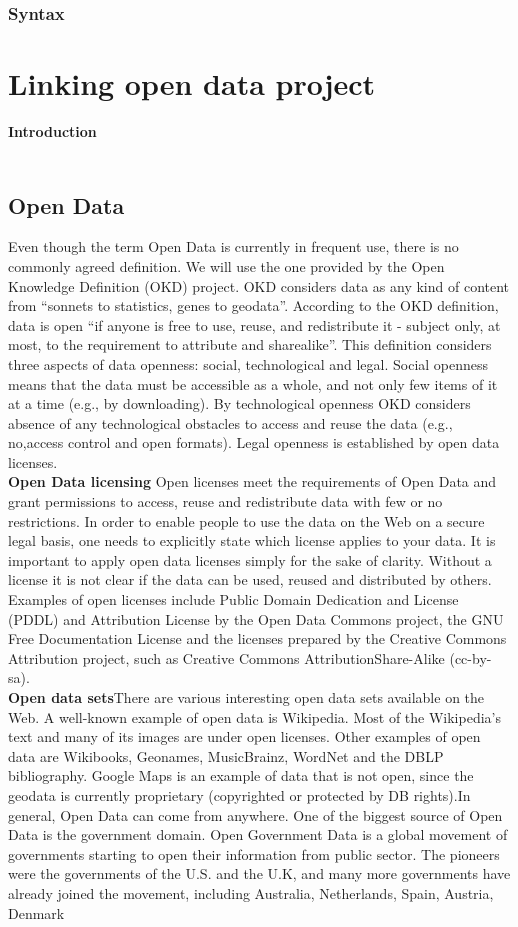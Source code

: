 \documentclass[a4paper,12pt,oneside]{report}
\begin{document}
{{{\subsection{Syntax}
\chapter{Linking open data project}
\textbf{\large Introduction}\\ \\
\section{Open Data}
{Even though the term Open Data is currently in frequent use, there is no commonly agreed definition. We will use the one provided by the Open Knowledge Definition (OKD) project. OKD considers data as any kind of content from “sonnets to statistics, genes to geodata”. According to the OKD definition, data is open “if anyone is free to use, reuse, and redistribute it - subject only, at most, to the requirement to attribute and sharealike”. This definition considers three aspects of data openness: social, technological and legal. Social openness means that the data must be accessible as a whole, and not only few items of it at a time (e.g., by downloading). By technological openness OKD considers absence of any technological obstacles to access and reuse the data (e.g., no,access control and open formats). Legal openness is established by open data licenses.\\
\textbf{Open Data licensing} Open licenses meet the requirements of Open Data and grant permissions to access, reuse and redistribute data with few or no restrictions. In order to enable people to use the data on the Web on a secure legal basis, one needs to
explicitly state which license applies to your data. It is important to apply open data licenses simply for the sake of clarity. Without a license it is not clear if the data can be used, reused and distributed by others. Examples of open licenses include Public
Domain Dedication and License (PDDL) and Attribution License by the Open Data Commons project, the GNU Free Documentation License and the licenses prepared by the Creative Commons Attribution project, such as Creative Commons AttributionShare-Alike (cc-by-sa).\\
\textbf{Open data sets}There are various interesting open data sets available on the Web. A well-known example of open data is Wikipedia. Most of the Wikipedia’s text and many of its images are under open licenses. Other examples of open data are Wikibooks, Geonames, MusicBrainz, WordNet and the DBLP bibliography. Google Maps is an example of data that is not open, since the geodata is currently proprietary (copyrighted or protected by DB rights).In general, Open Data can come from anywhere. One of the biggest source of Open Data is the government domain. Open Government Data is a global movement of governments starting to open their information from public sector. 
The pioneers were the governments of the U.S.  and the U.K, and many more governments have already joined the movement, including Australia, Netherlands, Spain, Austria, Denmark}
}}}
\end{document}
